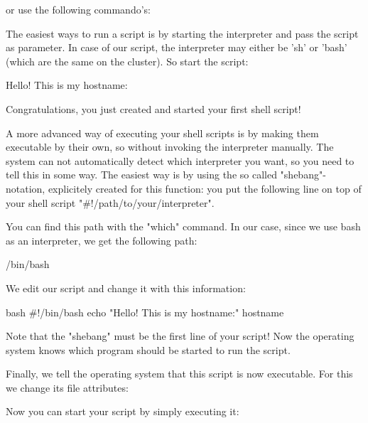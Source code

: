 or use the following commando's:
\begin{prompt}
\end{prompt}

The easiest ways to run a script is by starting the interpreter and pass the
script as parameter. In case of our script, the interpreter may either be 'sh'
or 'bash' (which are the same on the cluster). So start the script:

\begin{prompt}
Hello! This is my hostname:
\end{prompt}

Congratulations, you just created and started your first shell script!

A more advanced way of executing your shell scripts is by making them
executable by their own, so without invoking the interpreter manually. The
system can not automatically detect which interpreter you want, so you need to
tell this in some way. The easiest way is by using the so called
"shebang"-notation, explicitely created for this function: you put the
following line on top of your shell script "\#!/path/to/your/interpreter".

You can find this path with the "which" command. In our case, since we use bash
as an interpreter, we get the following path:

\begin{prompt}
/bin/bash
\end{prompt}

We edit our script and change it with this information:

\begin{code}{bash}
#!/bin/bash
echo "Hello! This is my hostname:"
hostname
\end{code}

Note that the "shebang" must be the first line of your script! Now the
operating system knows which program should be started to run the script.

Finally, we tell the operating system that this script is now executable. For
this we change its file attributes:

\begin{prompt}
\end{prompt}

Now you can start your script by simply executing it:

